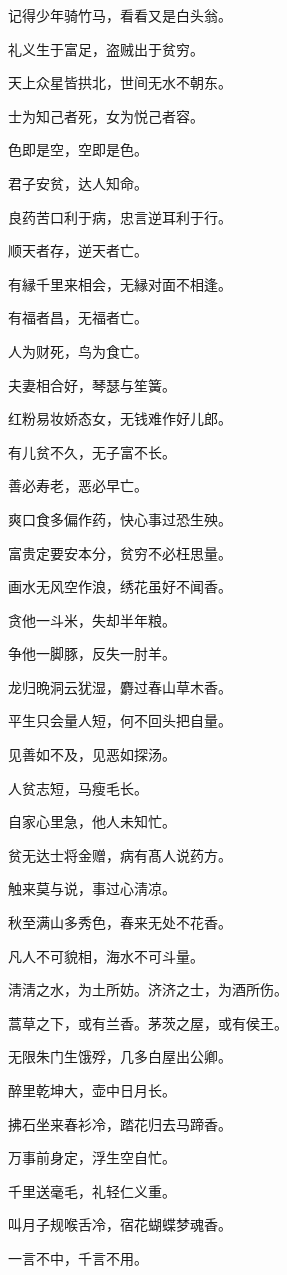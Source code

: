 \documentclass[12pt,oneside]{book}
\begin{document}
记得少年骑竹马，看看又是白头翁。

礼义生于富足，盗贼出于贫穷。

天上众星皆拱北，世间无水不朝东。

士为知己者死，女为悦己者容。

色即是空，空即是色。

君子安贫，达人知命。

良药苦口利于病，忠言逆耳利于行。

顺天者存，逆天者亡。

有縁千里来相会，无縁对面不相逢。

有福者昌，无福者亡。

人为财死，鸟为食亡。

夫妻相合好，琴瑟与笙簧。

红粉易妆娇态女，无钱难作好儿郎。

有儿贫不久，无子富不长。

善必寿老，恶必早亡。

爽口食多偏作药，快心事过恐生殃。

富贵定要安本分，贫穷不必枉思量。

画水无风空作浪，绣花虽好不闻香。

贪他一斗米，失却半年粮。

争他一脚豚，反失一肘羊。

龙归晩洞云犹湿，麝过春山草木香。

平生只会量人短，何不回头把自量。

见善如不及，见恶如探汤。

人贫志短，马瘦毛长。

自家心里急，他人未知忙。

贫无达士将金赠，病有髙人说药方。

触来莫与说，事过心淸凉。

秋至满山多秀色，春来无处不花香。

凡人不可貌相，海水不可斗量。

淸淸之水，为土所妨。济济之士，为酒所伤。

蒿草之下，或有兰香。茅茨之屋，或有侯王。

无限朱门生饿殍，几多白屋出公卿。

醉里乾坤大，壶中日月长。

拂石坐来春衫冷，踏花归去马蹄香。

万事前身定，浮生空自忙。

千里送毫毛，礼轻仁义重。

叫月子规喉舌冷，宿花蝴蝶梦魂香。

一言不中，千言不用。
\end{document}
